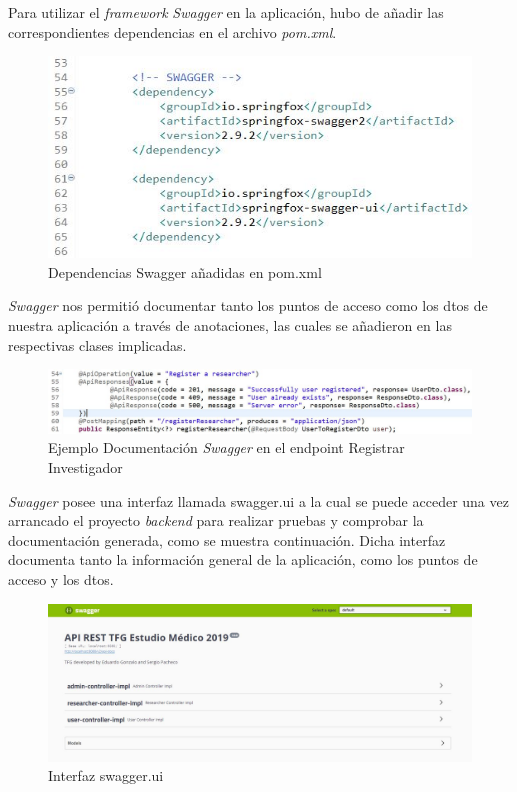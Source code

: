         Para utilizar el \textit{framework} \textit{Swagger} en la aplicación, hubo de añadir las correspondientes dependencias en el archivo \textit{pom.xml}.
        \newline
        
        \begin{figure}[h]
            \centering
            \includegraphics[width=1\textwidth]{images/swagger.JPG}
            \caption{Dependencias Swagger añadidas en pom.xml}
        \end{figure}
        
        \textit{Swagger} nos permitió documentar tanto los puntos de acceso como los dtos de nuestra aplicación a través de anotaciones, las cuales se añadieron en las respectivas clases implicadas.
        
          \begin{figure}[h]
            \centering
            \includegraphics[width=1\textwidth]{images/swaggerexample.JPG}
            \caption{Ejemplo Documentación \textit{Swagger} en el endpoint Registrar Investigador}
        \end{figure}
        
        
         \textit{Swagger} posee una interfaz llamada swagger.ui a la cual se puede acceder una vez arrancado el proyecto \textit{backend} para realizar pruebas y comprobar la documentación generada, como se muestra continuación. Dicha interfaz documenta tanto la información general de la aplicación, como los puntos de acceso y los dtos.
         \newline
         
          \begin{figure}[h]
            \centering
            \includegraphics[width=1\textwidth]{images/swaggergeneral.JPG}
            \caption{Interfaz swagger.ui}
        \end{figure}
        
